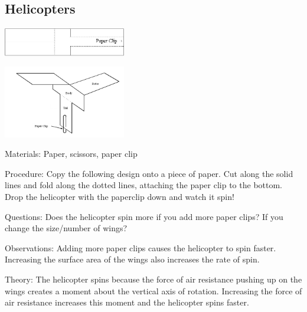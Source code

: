 \begin{multicols}{2}
\subsection{Helicopters} 

\begin{center}
\includegraphics[width=0.4\textwidth]{./img/helicopter-1.png}
\end{center}

\begin{center}
\includegraphics[width=0.4\textwidth]{./img/helicopter-2.png}
\end{center}

\begin{description*}
\item[Materials:]{Paper, scissors, paper clip}
\item[Procedure:]{Copy the following design onto a piece of paper. Cut along the solid lines and fold along the dotted lines, attaching the paper clip to the bottom. Drop the helicopter with the paperclip down and watch it spin!}
\item[Questions:]{Does the helicopter spin more if you add more paper clips? If you change the size/number of wings?}
\item[Observations:]{Adding more paper clips causes the helicopter to spin faster. Increasing the surface area of the wings also increases the rate of spin.}
\item[Theory:]{The helicopter spins because the force of air resistance pushing up on the wings creates a moment about the vertical axis of rotation. Increasing the force of air resistance increases this moment and the helicopter spins faster.}
\end{description*}


\end{multicols}
